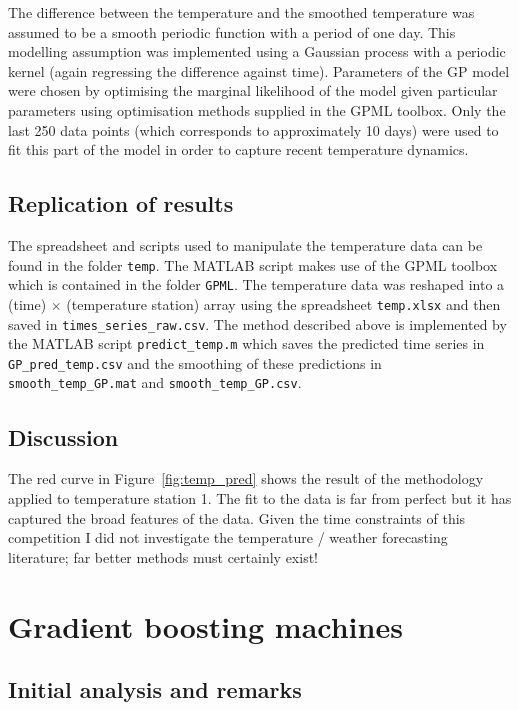 The difference between the temperature and the smoothed temperature was assumed to be a smooth periodic function with a period of one day.
This modelling assumption was implemented using a Gaussian process with a periodic kernel (again regressing the difference against time).
Parameters of the GP model were chosen by optimising the marginal likelihood of the model given particular parameters using optimisation methods supplied in the GPML toolbox\footnotemark.
Only the last 250 data points (which corresponds to approximately 10 days) were used to fit this part of the model in order to capture recent temperature dynamics.

\subsection{Replication of results}

The spreadsheet and scripts used to manipulate the temperature data can be found in the folder \texttt{temp}.
The MATLAB script makes use of the GPML toolbox which is contained in the folder \texttt{GPML}.
The temperature data was reshaped into a (time) $\times$ (temperature station) array using the spreadsheet \texttt{temp.xlsx} and then saved in \texttt{times\_series\_raw.csv}.
The method described above is implemented by the MATLAB script \texttt{predict\_temp.m} which saves the predicted time series in \texttt{GP\_pred\_temp.csv} and the smoothing of these predictions in \texttt{smooth\_temp\_GP.mat} and \texttt{smooth\_temp\_GP.csv}.

\subsection{Discussion}

The red curve in Figure~\ref{fig:temp_pred} shows the result of the methodology applied to temperature station 1.
The fit to the data is far from perfect but it has captured the broad features of the data.
Given the time constraints of this competition I did not investigate the temperature / weather forecasting literature; far better methods must certainly exist!

\section{Gradient boosting machines}

\label{sec:gbm}

\subsection{Initial analysis and remarks}

